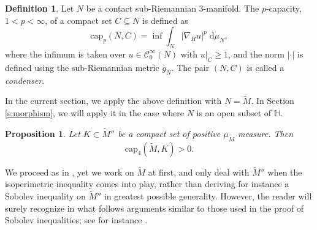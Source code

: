\documentclass[10pt,letterpaper]{amsart}
\newtheorem{prop}[thm]{Proposition}
\theoremstyle{definition}
\newtheorem{definition}[thm]{Definition}
\numberwithin{thm}{subsection}
\numberwithin{equation}{section}
\begin{document}
\begin{definition}\label{d:cap}
Let $N$ be a contact sub-Riemannian $3$-manifold. The $p$-capacity, $1<p<\infty$, of a compact set $C\subseteq N$ is defined as
\begin{displaymath}
\mathrm{cap}_p(N,C)= \inf \int_N |\nabla_H u|^p \;\mathrm{d}\mu_N,
\end{displaymath}
where the infimum is taken over $u\in \mathcal{C}_0^{\infty}(N)$ with $u|_C\geq 1$, and the norm $|\cdot|$ is defined using the sub-Riemannian metric $g_N$.
The pair $(N,C)$ is called a \emph{condenser}.
\end{definition}

In the current section, we apply the above definition with $N=\widetilde{M}$. In Section \ref{s:morphism}, we will apply it in the case where $N$ is an open subset of $\mathbb{H}$.

\begin{prop}\label{p:4hyperbolic}
Let $K \subset \widetilde{M}''$ be a compact set of positive $\mu_{\widetilde{M}}$ measure. Then
\begin{equation}\label{e:cap-pos}
\mathrm{cap}_4(\widetilde{M}, K) >0.
\end{equation}
\end{prop}

We proceed as in \cite[Theorem 1.3]{MR2832708}, yet we work on $\widetilde{M}$ at first, and only deal with $\widetilde{M}''$ when the isoperimetric inequality comes into play, rather than deriving for instance a Sobolev inequality on $\widetilde{M}''$ in greatest possible generality. However, the reader will surely recognize in what follows arguments similar to those used in the proof of Sobolev inequalities; see for instance \cite{Pansu}.
\end{document}

